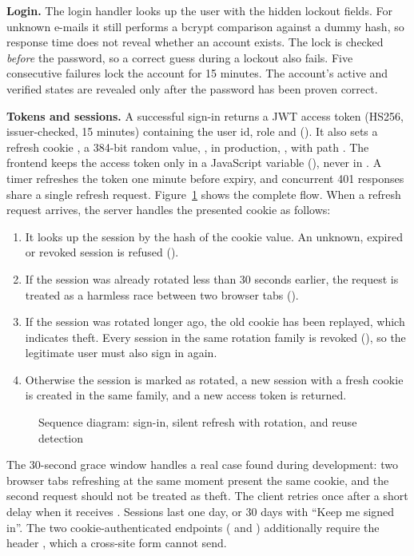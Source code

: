\textbf{Login.} The login handler looks up the user with the hidden lockout fields. For unknown e-mails it still performs a bcrypt comparison against a dummy hash, so response time does not reveal whether an account exists. The lock is checked \emph{before} the password, so a correct guess during a lockout also fails. Five consecutive failures lock the account for 15 minutes. The account's active and verified states are revealed only after the password has been proven correct.

\textbf{Tokens and sessions.} A successful sign-in returns a JWT access token (HS256, issuer-checked, 15 minutes) containing the user id, role and  (). It also sets a refresh cookie , a 384-bit random value, ,  in production, , with path . The frontend keeps the access token only in a JavaScript variable (), never in . A timer refreshes the token one minute before expiry, and concurrent 401 responses share a single refresh request. Figure~\ref{fig:seq-session} shows the complete flow. When a refresh request arrives, the server handles the presented cookie as follows:
\begin{enumerate}
  \item It looks up the session by the hash of the cookie value. An unknown, expired or revoked session is refused ().
  \item If the session was already rotated less than 30 seconds earlier, the request is treated as a harmless race between two browser tabs ().
  \item If the session was rotated longer ago, the old cookie has been replayed, which indicates theft. Every session in the same rotation family is revoked (), so the legitimate user must also sign in again.
  \item Otherwise the session is marked as rotated, a new session with a fresh cookie is created in the same family, and a new access token is returned.
\end{enumerate}

\begin{figure}[htbp]
\centering
\resizebox{0.95\textwidth}{!}{}
\caption{Sequence diagram: sign-in, silent refresh with rotation, and reuse detection}
\label{fig:seq-session}
\end{figure}

The 30-second grace window handles a real case found during development: two browser tabs refreshing at the same moment present the same cookie, and the second request should not be treated as theft. The client retries once after a short delay when it receives . Sessions last one day, or 30 days with ``Keep me signed in''. The two cookie-authenticated endpoints ( and ) additionally require the header , which a cross-site form cannot send.

